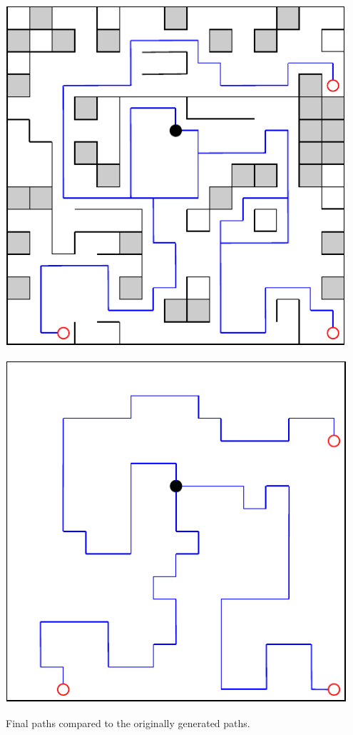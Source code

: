 \begin{center}
    \captionsetup{type=figure}
    \begin{minipage}{.5\textwidth}
        \centering
        \includegraphics[width=0.95\textwidth]{img/Final Paths.pdf}
    \end{minipage}%
    \begin{minipage}{.5\textwidth}
        \centering
        \includegraphics[width=0.95\textwidth]{img/Generated Paths.pdf}
    \end{minipage}
    \caption{Final paths compared to the originally generated paths.}
    \label{fig:final-paths}
\end{center}

